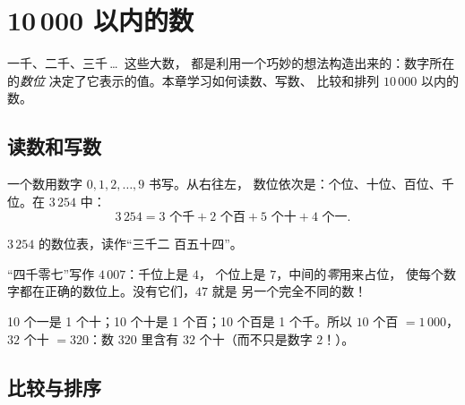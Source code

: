 \chapter{10\,000 以内的数}\label{ch:g3:numbers}

一千、二千、三千\,\dots\ 这些大数，
都是利用一个巧妙的想法构造出来的：数字所在的\emph{数位}
决定了它表示的值。本章学习如何读数、写数、
比较和排列 $10\,000$ 以内的数。

\section{读数和写数}

\begin{definition}[数位值]\label{def:g3:numbers:place}
一个数用数字 $0, 1, 2, \dots, 9$ 书写。从右往左，
数位依次是：个位、十位、百位、千位。在
$3\,254$ 中：
\[
3\,254 = 3 \text{ 个千} + 2 \text{ 个百} + 5 \text{ 个十}
+ 4 \text{ 个一}.
\]
\end{definition}

\begin{omfigure}

{\small $3\,254$ 的数位表，读作“三千二
百五十四”。}
\end{omfigure}

\begin{example}[占位的零]\label{ex:g3:numbers:zero}
“四千零七”写作 $4\,007$：千位上是 $4$，
个位上是 $7$，中间的\emph{零}用来占位，
使每个数字都在正确的数位上。没有它们，$47$ 就是
另一个完全不同的数！
\end{example}

\begin{example}[相邻数位的换算]\label{ex:g3:numbers:exchange}
10 个一是 1 个十；10 个十是 1 个百；10 个百是
1 个千。所以 $10$ 个百 $= 1\,000$，$32$ 个十
$= 320$：数 $320$ 里含有 $32$ 个十（而不只是数字
$2$！）。
\end{example}

\section{比较与排序}

